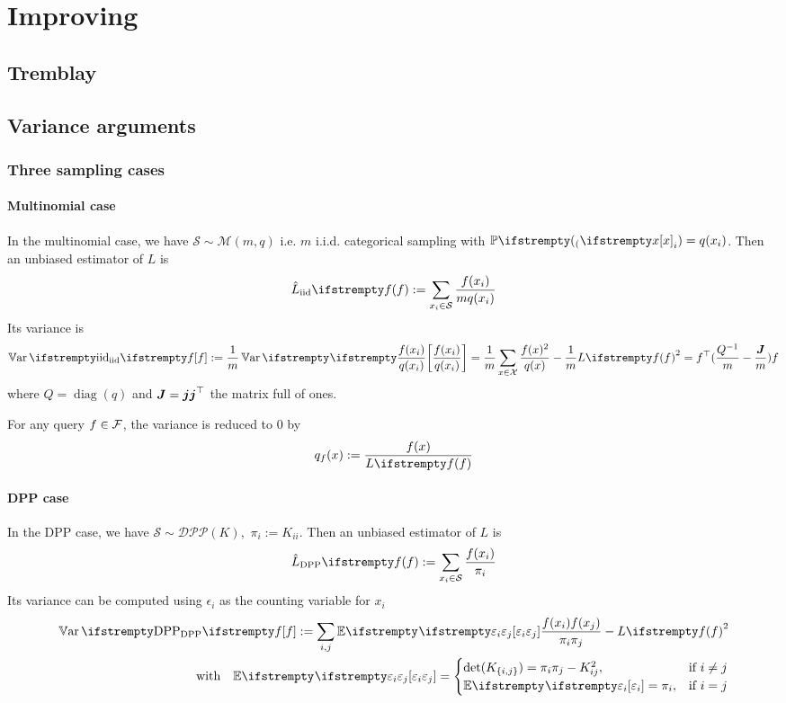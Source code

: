\chapter{Improving}
\section{Tremblay}


\section{Variance arguments}
\subsection{Three sampling cases}
\subsubsection{Multinomial case}


In the multinomial case, we have $\mathcal S \sim \mathcal M(m, q)$ i.e. $m$ i.i.d. categorical sampling with $\PP(x_i) = q(x_i)$.
Then an unbiased estimator of $L$ is
\begin{equation*}
	\estloss{\textrm{iid}}{\query} := \sum_{x_i\in \mathcal S} \frac{\query(x_i)}{m q(x_i)}
\end{equation*}
Its variance is
\begin{equation}
	\Var{\textrm{iid}}{\query} :=\frac{1}{m} \Var{}{\frac {\query(x_i)} {q(x_i)}}
	=\frac{1}{m} \sum_{x \in \mathcal{X}} \frac{\query(x)^{2}}{q(x)} -\frac{1}{m} \loss{\query}^{2} = \query\T(\frac{Q^{-1}} m - \frac{\moones} m)\query
\end{equation}
where $Q = \operatorname{diag}(q)$ and $\boldsymbol{J} = \boldsymbol{j} \boldsymbol{j} ^\top$ the matrix full of ones. 

For any query $f \in \mathcal{F}$, the variance is reduced to 0 by
$$
q_{\query}(x):=\frac{ \query(x)}{\loss{\query}}
$$


\subsubsection{DPP case}
In the DPP case, we have $ \mathcal S \sim \mathcal{DPP}(K)$, \,$\pi_i := K_{ii}$. Then an unbiased estimator of $L$ is
\begin{equation*}
	\estloss{\textrm{DPP}}{\query} := \sum_{x_i\in \mathcal S} \frac{\query(x_i)}{\pi_i}
\end{equation*}
Its variance can be computed using $\epsilon_i$ as the counting variable for $x_i$
\begin{align*}
	\Var{\textrm{DPP}}{\query}
:=\sum_{i, j}\EE{}{\epsilon_{i} \epsilon_{j}} \frac{\query(x_{i}) \query(x_{j})} {\pi_{i} \pi_{j}}  - \loss{\query}^{2}\\
\quad \text{with} \quad
\EE{}{\epsilon_{i} \epsilon_{j}}=
\begin{cases}
	\det(K_{\{i, j\}})=\pi_{i} \pi_{j}-K_{ij}^{2}, & \text{if } i \neq j \\
	\EE{}{\epsilon_{i}}=\pi_{i},&\text{if } i = j
\end{cases}
\end{align*}



